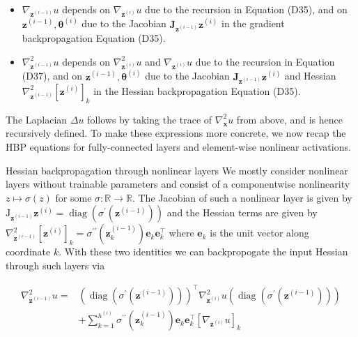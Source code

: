\documentclass[10pt]{article}
\begin{document}
\begin{itemize}
  \item $\nabla_{\boldsymbol{z}^{(i-1)}} u$ depends on $\nabla_{\boldsymbol{z}^{(i)}} u$ due to the recursion in Equation (D35), and on $\boldsymbol{z}^{(i-1)}, \boldsymbol{\theta}^{(i)}$ due to the Jacobian $\boldsymbol{J}_{\boldsymbol{z}^{(i-1)}} \boldsymbol{z}^{(i)}$ in the gradient backpropagation Equation (D35).
  \item $\nabla_{\boldsymbol{z}^{(i-1)}}^{2} u$ depends on $\nabla_{\boldsymbol{z}^{(i)}}^{2} u$ and $\nabla_{\boldsymbol{z}^{(i)}} u$ due to the recursion in Equation (D37), and on $\boldsymbol{z}^{(i-1)}, \boldsymbol{\theta}^{(i)}$ due to the Jacobian $\boldsymbol{J}_{\boldsymbol{z}^{(i-1)}} \boldsymbol{z}^{(i)}$ and Hessian $\nabla_{\boldsymbol{z}^{(i-1)}}^{2}\left[\boldsymbol{z}^{(i)}\right]_{k}$ in the Hessian backpropagation Equation (D35).
\end{itemize}

The Laplacian $\Delta u$ follows by taking the trace of $\nabla_{\boldsymbol{x}}^{2} u$ from above, and is hence recursively defined. To make these expressions more concrete, we now recap the HBP equations for fully-connected layers and element-wise nonlinear activations.

Hessian backpropagation through nonlinear layers We mostly consider nonlinear layers without trainable parameters and consist of a componentwise nonlinearity $z \mapsto \sigma(z)$ for some $\sigma: \mathbb{R} \rightarrow \mathbb{R}$. The Jacobian of such a nonlinear layer is given by $\mathrm{J}_{\boldsymbol{z}^{(i-1)}} \boldsymbol{z}^{(i)}=\operatorname{diag}\left(\sigma^{\prime}\left(\boldsymbol{z}^{(i-1)}\right)\right)$ and the Hessian terms are given by $\nabla_{\boldsymbol{z}^{(i-1)}}^{2}\left[\boldsymbol{z}^{(i)}\right]_{k}=\sigma^{\prime \prime}\left(\boldsymbol{z}_{k}^{(i-1)}\right) \boldsymbol{e}_{k} \boldsymbol{e}_{k}^{\top}$ where $\boldsymbol{e}_{k}$ is the unit vector along coordinate $k$. With these two identities we can backpropogate the input Hessian through such layers via


\begin{align*}
\nabla_{\boldsymbol{z}^{(i-1)}}^{2} u= & \left(\operatorname{diag}\left(\sigma^{\prime}\left(\boldsymbol{z}^{(i-1)}\right)\right)\right)^{\top} \nabla_{\boldsymbol{z}^{(i)}}^{2} u\left(\operatorname{diag}\left(\sigma^{\prime}\left(\boldsymbol{z}^{(i-1)}\right)\right)\right) \\
& +\sum_{k=1}^{h^{(i)}} \sigma^{\prime \prime}\left(\boldsymbol{z}_{k}^{(i-1)}\right) \boldsymbol{e}_{k} \boldsymbol{e}_{k}^{\top}\left[\nabla_{\boldsymbol{z}^{(i)}} u\right]_{k} \tag{D38}
\end{align*}
\end{document}
